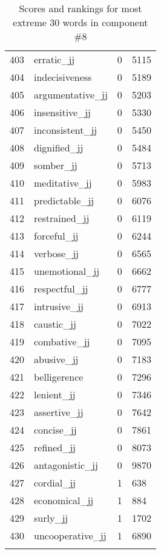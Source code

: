 \begin{longtable}[!htbp]{| rlr@{.}l |}
    403 & erratic\_jj & 0 & 5115 \\
    404 & indecisiveness & 0 & 5189 \\
    405 & argumentative\_jj & 0 & 5203 \\
    406 & insensitive\_jj & 0 & 5330 \\
    407 & inconsistent\_jj & 0 & 5450 \\
    408 & dignified\_jj & 0 & 5484 \\
    409 & somber\_jj & 0 & 5713 \\
    410 & meditative\_jj & 0 & 5983 \\
    411 & predictable\_jj & 0 & 6076 \\
    412 & restrained\_jj & 0 & 6119 \\
    413 & forceful\_jj & 0 & 6244 \\
    414 & verbose\_jj & 0 & 6565 \\
    415 & unemotional\_jj & 0 & 6662 \\
    416 & respectful\_jj & 0 & 6777 \\
    417 & intrusive\_jj & 0 & 6913 \\
    418 & caustic\_jj & 0 & 7022 \\
    419 & combative\_jj & 0 & 7095 \\
    420 & abusive\_jj & 0 & 7183 \\
    421 & belligerence & 0 & 7296 \\
    422 & lenient\_jj & 0 & 7346 \\
    423 & assertive\_jj & 0 & 7642 \\
    424 & concise\_jj & 0 & 7861 \\
    425 & refined\_jj & 0 & 8073 \\
    426 & antagonistic\_jj & 0 & 9870 \\
    427 & cordial\_jj & 1 & 638 \\
    428 & economical\_jj & 1 & 884 \\
    429 & surly\_jj & 1 & 1702 \\
    430 & uncooperative\_jj & 1 & 6890 \\
    \hline
    \caption{Scores and rankings for most extreme 30 words in component \#8} \\
\end{longtable}
